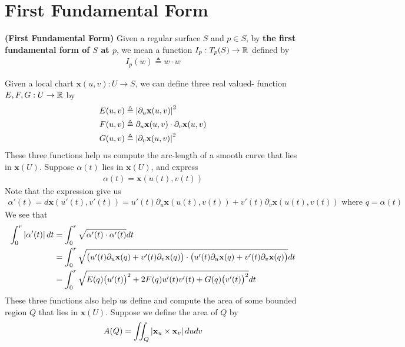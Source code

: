 \documentclass{report}
\begin{document}
\section{First Fundamental Form}
\begin{definition}
\textbf{(First Fundamental Form)} Given a regular surface $S$ and $p\in  S$, by \textbf{the first fundamental form of $S$ at $p$}, we mean a function $I_p:T_p(S)\rightarrow \mathbb{R}$ defined by 
\begin{align*}
I_p(w)\triangleq w\cdot w
\end{align*}
\end{definition}
\begin{mdframed}
Given a local chart $\textbf{x}(u,v):U\rightarrow S$, we can define three real valued- function $E,F,G: U\rightarrow \mathbb{R}$ by 
\begin{align*}
E(u,v)&\triangleq  \left|\partial_u \textbf{x}(u,v)\right|^2 \\
F(u,v)&\triangleq  \partial_u\textbf{x}(u,v)\cdot \partial_v \textbf{x}(u,v)\\
G(u,v)&\triangleq \left|\partial_v \textbf{x}(u,v)\right|^2
\end{align*}
These three functions help us compute the arc-length of a smooth curve that lies in $\textbf{x}(U)$. Suppose $\alpha (t)$ lies in $\textbf{x}(U)$, and express 
\begin{align*}
\alpha (t)=\textbf{x}(u(t),v(t))
\end{align*}
Note that the expression give us 
\begin{align*}
\alpha'(t)=d\textbf{x}(u'(t),v'(t))=u'(t)\partial_u \textbf{x}(u(t),v(t))+v'(t)\partial_v \textbf{x}(u(t),v(t))\text{ where $q=\alpha (t)$ }
\end{align*}
We see that 
\begin{align*}
  \int_0^r \left|\alpha '(t)\right|dt&= \int_0^r \sqrt{\alpha '(t)\cdot \alpha '(t)} dt\\
  &=\int_0^r \sqrt{\big(u'(t)\partial_u \textbf{x}(q)+v'(t)\partial_v \textbf{x}(q) \big)\cdot \big(u'(t)\partial_u \textbf{x}(q)+v'(t)\partial_v \textbf{x}(q) \big)}dt\\
  &=\int_0^r \sqrt{E(q)\big(u'(t) \big)^2 + 2F(q)u'(t)v'(t)+G(q)\big(v'(t) \big)^2} dt
\end{align*}
These three functions also help us define and compute the area of some bounded region $Q$ that lies in $\textbf{x}(U)$. Suppose we define the area of $Q$ by 
\begin{align*}
A(Q)=\iint_Q \left|\textbf{x}_u \times \textbf{x}_v\right| dudv 
\end{align*}

\end{mdframed}
\end{document}
